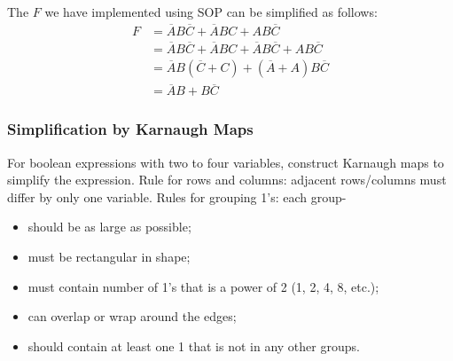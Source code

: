 \begin{example}
    The $F$ we have implemented using SOP can be simplified as follows:
\begin{align*}
    F &= \overline{A}B\overline{C} + \overline{A}BC + AB\overline{C} \\
      &= \overline{A}B\overline{C} + \overline{A}BC + \overline{A}B\overline{C} + AB\overline{C} \\
      &= \overline{A}B \left(\overline{C} + C\right) + \left(\overline{A} + A\right) B\overline{C} \\
      &= \overline{A}B + B\overline{C}
\end{align*}
\end{example}

\subsubsection{Simplification by Karnaugh Maps}

For boolean expressions with two to four variables, construct Karnaugh maps to simplify
the expression. Rule for rows and columns: adjacent rows/columns must differ by only one variable.
Rules for grouping 1's: each group-
\begin{itemize}
    \item should be as large as possible;
    \item must be rectangular in shape;
    \item must contain number of 1's that is a power of 2 (1, 2, 4, 8, etc.);
    \item can overlap or wrap around the edges;
    \item should contain at least one 1 that is not in any other groups.
\end{itemize}

